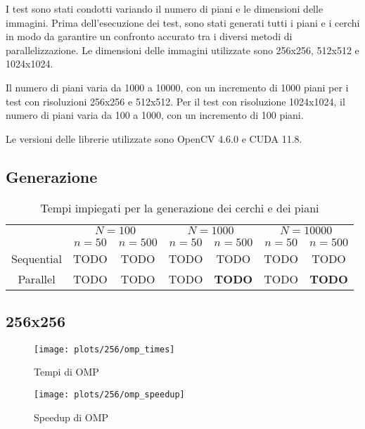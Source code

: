 I test sono stati condotti variando il numero di piani e le dimensioni delle immagini.
Prima dell'esecuzione dei test, sono stati generati tutti i piani e i cerchi in modo da garantire un confronto accurato
tra i diversi metodi di parallelizzazione.
Le dimensioni delle immagini utilizzate sono 256x256, 512x512 e 1024x1024.

Il numero di piani varia da 1000 a 10000, con un incremento di 1000 piani per i test con risoluzioni 256x256 e 512x512.
Per il test con risoluzione 1024x1024, il numero di piani varia da 100 a 1000, con un incremento di 100 piani.

Le versioni delle librerie utilizzate sono OpenCV 4.6.0 e CUDA 11.8.

\subsection{Generazione}
\begin{table}[H]
    \centering
    \begin{tabular}{c|c|c|c|c|c|c|}
        & \multicolumn{2}{|c|}{$N = 100$} & \multicolumn{2}{|c|}{$N = 1000$} & \multicolumn{2}{|c|}{$N = 10000$} \\
        & $n=50$ & $n=500$ & $n=50$ & $n=500$ & $n=50$ & $n=500$ \\
        \hline
        Sequential & TODO & TODO & TODO & TODO & TODO & TODO \\
        Parallel & TODO & TODO & TODO & \textbf{TODO} & TODO & \textbf{TODO} \\
    \end{tabular}
    \caption{\label{tab:gen}Tempi impiegati per la generazione dei cerchi e dei piani}
\end{table}

\subsection{256x256}\label{subsec:256x256}
\begin{figure}[H]
    \centering
    \begin{minipage}{0.49\textwidth}
        \centering
        \texttt{[image: plots/256/omp\_times]}
        \caption{Tempi di OMP}\label{fig:times-256-omp}
    \end{minipage}
    \begin{minipage}{0.49\textwidth}
        \centering
        \texttt{[image: plots/256/omp\_speedup]}
        \caption{Speedup di OMP}\label{fig:speedup-256-omp}
    \end{minipage}
\end{figure}

